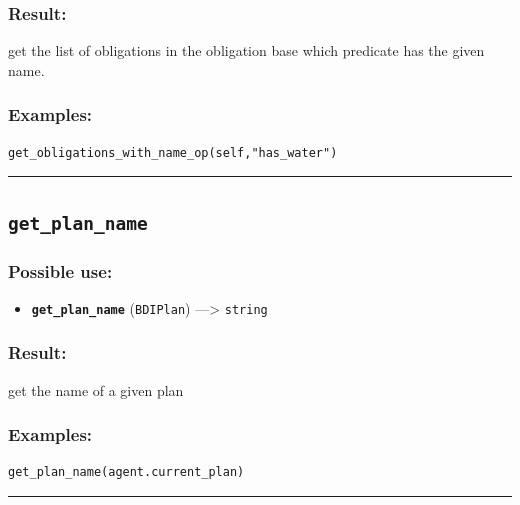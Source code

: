 \documentclass[]{book}
\providecommand{\tightlist}{%
  \setlength{\itemsep}{0pt}\setlength{\parskip}{0pt}}
\theoremstyle{definition}
\theoremstyle{definition}
\theoremstyle{definition}
\theoremstyle{remark}
\begin{document}
\subsubsection{Result:}\label{result-218}

get the list of obligations in the obligation base which predicate has
the given name.

\subsubsection{Examples:}\label{examples-171}

\begin{verbatim}
get_obligations_with_name_op(self,"has_water") 
\end{verbatim}

\begin{center}\rule{0.5\linewidth}{\linethickness}\end{center}

\subsection{\texorpdfstring{\texttt{get\_plan\_name}}{get\_plan\_name}}\label{get_plan_name}

\subsubsection{Possible use:}\label{possible-use-225}

\begin{itemize}
\tightlist
\item
  \textbf{\texttt{get\_plan\_name}} (\texttt{BDIPlan}) ---\textgreater{}
  \texttt{string}
\end{itemize}

\subsubsection{Result:}\label{result-219}

get the name of a given plan

\subsubsection{Examples:}\label{examples-172}

\begin{verbatim}
get_plan_name(agent.current_plan) 
\end{verbatim}

\begin{center}\rule{0.5\linewidth}{\linethickness}\end{center}
\end{document}
